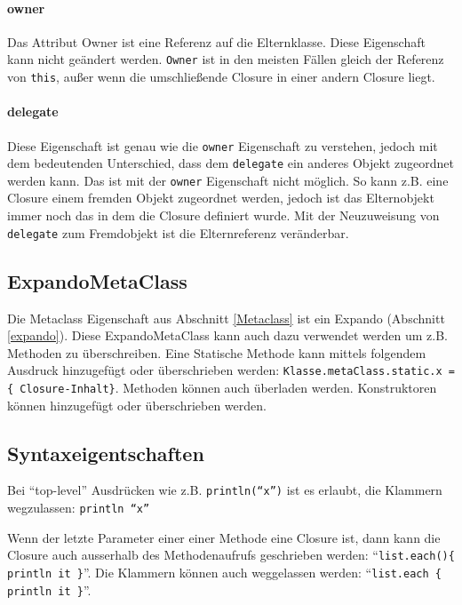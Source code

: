 \documentclass[11pt,english,ngerman, headsepline]{scrreprt}
\begin{document}
\paragraph{owner}
Das Attribut Owner ist eine Referenz auf die Elternklasse. Diese Eigenschaft
kann nicht geändert werden. \texttt{Owner} ist in den meisten Fällen gleich der
Referenz von  \texttt{this}, außer wenn die umschließende Closure in einer
andern Closure liegt.
\paragraph{delegate}
Diese Eigenschaft ist genau wie die \texttt{owner} Eigenschaft zu verstehen,
jedoch mit dem bedeutenden Unterschied, dass dem \texttt{delegate} ein anderes
Objekt zugeordnet werden kann. Das ist mit der \texttt{owner} Eigenschaft nicht
möglich. So kann z.B. eine Closure einem fremden Objekt zugeordnet werden,
jedoch ist das Elternobjekt immer noch das in dem die Closure definiert wurde.
Mit der Neuzuweisung von \texttt{delegate} zum Fremdobjekt ist die
Elternreferenz veränderbar.

\subsection{ExpandoMetaClass}

Die Metaclass Eigenschaft aus Abschnitt \ref{Metaclass} ist ein Expando
(Abschnitt \ref{expando}).
Diese ExpandoMetaClass kann auch dazu verwendet werden um z.B. Methoden zu
überschreiben. Eine Statische Methode kann mittels folgendem Ausdruck hinzugefügt
oder überschrieben werden: \texttt{Klasse.metaClass.static.x = \{
Closure-Inhalt\}}. 
Methoden können auch überladen werden. Konstruktoren können hinzugefügt oder
überschrieben werden. 
  


\subsection{Syntaxeigentschaften}

Bei ``top-level'' Ausdrücken wie z.B. \texttt{println(``x'')} ist es erlaubt,
die Klammern wegzulassen: \texttt{println ``x'' }
 
Wenn der letzte Parameter einer einer Methode eine Closure ist, dann kann die
Closure auch ausserhalb des Methodenaufrufs geschrieben werden:
``\texttt{list.each()\{ println it \}}''. Die Klammern können auch weggelassen
werden: ``\texttt{list.each \{ println it \}}''.  
  
\end{document}
